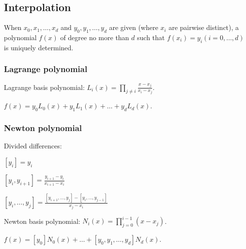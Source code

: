 \subsection*{Interpolation}

When $x_0, x_1, \dots, x_d$ and $y_0, y_1, \dots, y_d$
are given (where $x_i$ are pairwise distinct), a polynomial
$f(x)$ of degree no more than $d$ such that $f(x_i) = y_i (i = 0, \dots, d)$
is uniquely determined.

\subsubsection*{Lagrange polynomial}

Lagrange basis polynomial: $L_i(x) = \prod_{j \ne i} \frac{x - x_j}{x_i - x_j}$.
	
$f(x) = y_0 L_0(x) + y_1 L_1(x) + \dots + y_d L_d(x)$.

\subsubsection*{Newton polynomial}

Divided differences:

$[y_i] = y_i$

$[y_i, y_{i + 1}] = \frac{y_{i + 1} - y_i}{x_{i + 1} - x_i}$

$[y_i, \dots, y_j] = \frac{[y_{i + 1}, \dots, y_j] - [y_i, \dots, y_{j - 1}]}{x_j - x_i}$

Newton basis polynomial: $N_i(x) = \prod_{j=0}^{i-1} (x - x_j)$.

$f(x) = [y_0] N_0(x) + \dots + [y_0, y_1, \dots, y_d] N_d(x)$.
